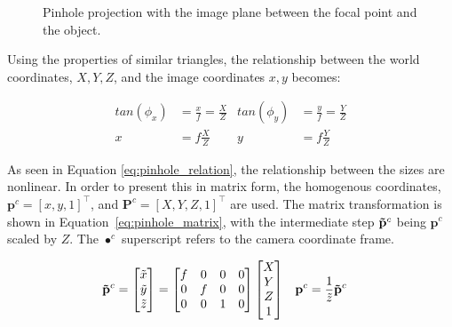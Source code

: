\begin{figure}[!htb]

    \caption{Pinhole projection with the image plane between the focal point and the object.}
    \label{fig:pinhole}
    
\end{figure}

Using the properties of similar triangles, the relationship between the world coordinates, $X,Y,Z$, and the image coordinates $x,y$ becomes:

\begin{align}
    tan(\phi_x) &= \frac{x}{f} = \frac{X}{Z} & tan(\phi_y) &= \frac{y}{f} = \frac{Y}{Z} \label{eq:pinhole_tan_relation} \\
    x &= f\frac{X}{Z} & y &=f\frac{Y}{Z}
    \label{eq:pinhole_relation}
\end{align}

As seen in Equation \eqref{eq:pinhole_relation}, the relationship between the sizes are nonlinear. In order to present this in matrix form, the homogenous coordinates, $\mathbf{p}^c=[x,y,1]^\top$, and $\mathbf{P}^c=[X,Y,Z,1]^\top$ are used. The matrix transformation is shown in Equation~\eqref{eq:pinhole_matrix}, with the intermediate step $\mathbf{\Tilde{p}}^c$ being $\mathbf{p}^c$ scaled by $Z$. The $\bullet^c$ superscript refers to the camera coordinate frame.

\begin{align}
    \mathbf{\Tilde{p}}^c &= \begin{bmatrix}
        \Tilde{x} \\ \Tilde{y} \\ \Tilde{z}
    \end{bmatrix} = \begin{bmatrix}
        f & 0 & 0 & 0 \\
        0 & f & 0 & 0 \\
        0 & 0 & 1 & 0
    \end{bmatrix}\begin{bmatrix}
        X \\ Y \\ Z \\ 1
    \end{bmatrix} &
    \mathbf{p}^c &= \frac{1}{\Tilde{z}}\mathbf{\Tilde{p}}^c
    \label{eq:pinhole_matrix}
\end{align}

